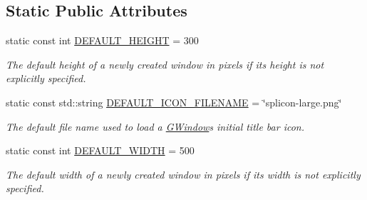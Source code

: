 \subsection*{Static Public Attributes}
\begin{DoxyCompactItemize}
\item 
static const int \mbox{\hyperlink{classGWindow_a2fab6d7a2bcb15d1595cacc38230f21b}{D\+E\+F\+A\+U\+L\+T\+\_\+\+H\+E\+I\+G\+HT}} = 300
\begin{DoxyCompactList}\small\item\em The default height of a newly created window in pixels if its height is not explicitly specified. \end{DoxyCompactList}\item 
static const std\+::string \mbox{\hyperlink{classGWindow_a666fcf3a55503322fbfd6314c4846542}{D\+E\+F\+A\+U\+L\+T\+\_\+\+I\+C\+O\+N\+\_\+\+F\+I\+L\+E\+N\+A\+ME}} = \char`\"{}splicon-\/large.\+png\char`\"{}
\begin{DoxyCompactList}\small\item\em The default file name used to load a \mbox{\hyperlink{classGWindow}{G\+Window}}\textquotesingle{}s initial title bar icon. \end{DoxyCompactList}\item 
static const int \mbox{\hyperlink{classGWindow_af7b8fc8ce7f700c853cfbc36ee8cc474}{D\+E\+F\+A\+U\+L\+T\+\_\+\+W\+I\+D\+TH}} = 500
\begin{DoxyCompactList}\small\item\em The default width of a newly created window in pixels if its width is not explicitly specified. \end{DoxyCompactList}\end{DoxyCompactItemize}
